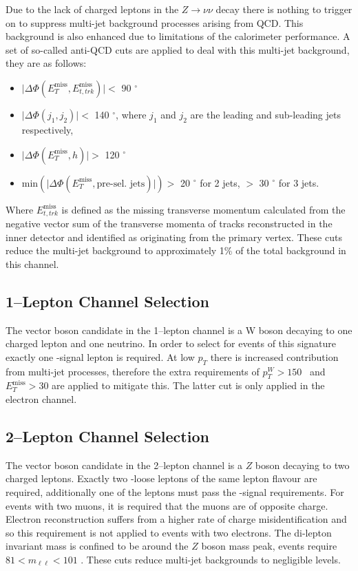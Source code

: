 Due to the lack of charged leptons in the $Z \rightarrow \nu\nu$ decay there is
nothing to trigger on to suppress multi-jet background processes arising from
QCD. This background is also enhanced due to limitations of the calorimeter
performance. A set of so-called anti-QCD cuts are applied to deal with this
multi-jet background, they are as follows:
\begin{itemize}
\item $\lvert \Delta \Phi ( E_T^{\text{miss}} ,
  E_{t, trk}^{\text{miss}} ) \rvert <$ 90 $^\circ$
\item $\lvert \Delta \Phi ( j_1 , j_2 ) \rvert <$ 140 $^\circ$, where $j_1$ and
  $j_2$ are the leading and sub-leading jets respectively,
\item $\lvert \Delta \Phi ( E_T^{\text{miss}} , h ) \rvert >$ 120 $^\circ$
\item $\text{min} ( \lvert \Delta \Phi ( E_T^{\text{miss}} ,
  \text{pre-sel. jets}) \rvert ) >$ 20 $^\circ$ for  2 jets,
  $>$ 30 $^\circ$ for 3 jets.
\end{itemize}
Where $E_{t, trk}^{\text{miss}}$ is defined as the missing transverse momentum
calculated from the negative vector sum of the transverse momenta of tracks
reconstructed in the inner detector and identified as originating from the
primary vertex. These cuts reduce the multi-jet background to approximately 1\%
of the total background in this channel.

\subsection{1--Lepton Channel Selection}
\label{sec:1lep-selection}

The vector boson candidate in the 1--lepton channel is a W boson decaying to one
charged lepton and one neutrino. In order to select for events of this signature
exactly one \WH-signal lepton is required. At low $p_T$ there is increased
contribution from multi-jet processes, therefore the extra requirements of
$p_T^{W} > 150$ \GeV\ and $E_T^{\text{miss}} > 30$ \GeV are applied to mitigate
this. The latter cut is only applied in the electron channel.  

\subsection{2--Lepton Channel Selection}
\label{sec:2lep-selection}

The vector boson candidate in the 2--lepton channel is a $Z$ boson decaying to
two charged leptons. Exactly two \VH-loose leptons of the same lepton flavour
are required, additionally one of the leptons must pass the \ZH-signal
requirements. For events with two muons, it is required that the muons are of
opposite charge. Electron reconstruction suffers from a higher rate of charge
misidentification and so this requirement is not applied to events with two
electrons. The di-lepton invariant mass is confined to be around the $Z$ boson
mass peak, events require $81 < m_{\ell\ell} < 101$ \GeV. These cuts reduce
multi-jet backgrounds to negligible levels.

